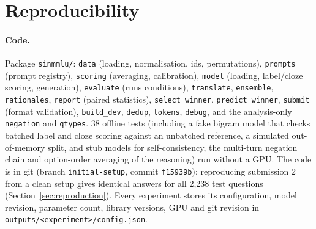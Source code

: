 \documentclass[10pt,a4paper]{article}
\begin{document}
\section{Reproducibility}\label{sec:repro}
\paragraph{Code.} Package \texttt{sinmmlu/}: \texttt{data} (loading, normalisation, ids, permutations), \texttt{prompts}
(prompt registry), \texttt{scoring} (averaging, calibration), \texttt{model} (loading, label/cloze scoring, generation),
\texttt{evaluate} (runs conditions), \texttt{translate}, \texttt{ensemble}, \texttt{rationales}, \texttt{report}
(paired statistics), \texttt{select\_winner}, \texttt{predict\_winner}, \texttt{submit} (format validation),
\texttt{build\_dev}, \texttt{dedup}, \texttt{tokens}, \texttt{debug}, and the analysis-only \texttt{negation} and
\texttt{qtypes}. 38 offline tests (including a fake bigram model that checks batched label and cloze scoring against
an unbatched reference, a simulated out-of-memory split, and stub models for self-consistency, the multi-turn
negation chain and option-order averaging of the reasoning) run without a GPU.
The code is in git (branch \texttt{initial-setup}, commit \texttt{f15939b}); reproducing submission 2 from a clean setup
gives identical answers for all 2,238 test questions (Section~\ref{sec:reproduction}). Every experiment stores its configuration, model revision, parameter count, library versions, GPU and
git revision in \texttt{outputs/<experiment>/config.json}.
\end{document}
